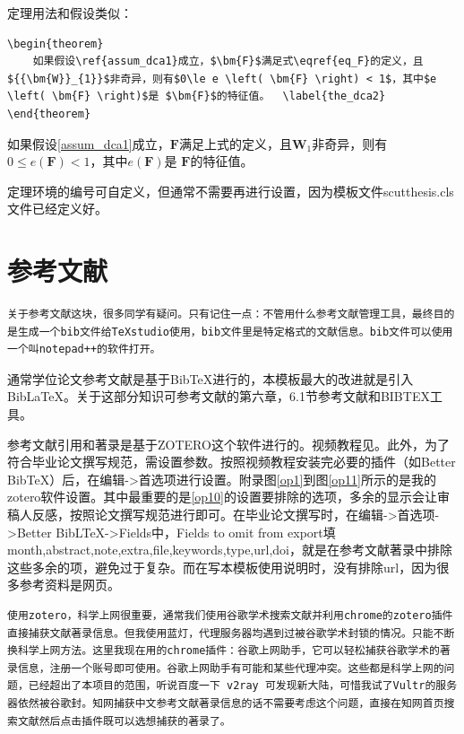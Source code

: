 定理用法和假设类似：
\begin{lstlisting}
\begin{theorem}
	如果假设\ref{assum_dca1}成立，$\bm{F}$满足式\eqref{eq_F}的定义，且${{\bm{W}}_{1}}$非奇异，则有$0\le e \left( \bm{F} \right) < 1$，其中$e \left( \bm{F} \right)$是 $\bm{F}$的特征值。	\label{the_dca2}
\end{theorem}
\end{lstlisting}
\begin{theorem}
	如果假设\ref{assum_dca1}成立，$\bm{F}$满足上式的定义，且${{\bm{W}}_{1}}$非奇异，则有$0\le e \left( \bm{F} \right) < 1$，其中$e \left( \bm{F} \right)$是 $\bm{F}$的特征值。	\label{the_dca2}
\end{theorem}

定理环境的编号可自定义，但通常不需要再进行设置，因为模板文件scutthesis.cls文件已经定义好。
\section{参考文献}

\begin{lstlisting}
关于参考文献这块，很多同学有疑问。只有记住一点：不管用什么参考文献管理工具，最终目的是生成一个bib文件给TeXstudio使用，bib文件里是特定格式的文献信息。bib文件可以使用一个叫notepad++的软件打开。
\end{lstlisting}

通常学位论文参考文献是基于BibTeX进行的，本模板最大的改进就是引入BibLaTeX。关于这部分知识可参考文献\parencite{_c,_g}的第六章，6.1节参考文献和BIBTEX工具。

参考文献引用和著录是基于ZOTERO这个软件进行的。视频教程见\parencite{_k}。此外，为了符合毕业论文撰写规范，需设置参数。按照视频教程安装完必要的插件（如Better BibTeX）后，在编辑->首选项进行设置。附录图\ref{op1}到图\ref{op11}所示的是我的zotero软件设置。其中最重要的是\ref{op10}的设置要排除的选项，多余的显示会让审稿人反感，按照论文撰写规范进行即可。在毕业论文撰写时，在编辑->首选项->Better BibLTeX->Fields中，Fields to omit from export填month,abstract,note,extra,file,keywords,type,url,doi，就是在参考文献著录中排除这些多余的项，避免过于复杂。而在写本模板使用说明时，没有排除url，因为很多参考资料是网页。

\begin{lstlisting}
使用zotero，科学上网很重要，通常我们使用谷歌学术搜索文献并利用chrome的zotero插件直接捕获文献著录信息。但我使用蓝灯，代理服务器均遇到过被谷歌学术封锁的情况。只能不断换科学上网方法。这里我现在用的chrome插件：谷歌上网助手，它可以轻松捕获谷歌学术的著录信息，注册一个账号即可使用。谷歌上网助手有可能和某些代理冲突。这些都是科学上网的问题，已经超出了本项目的范围，听说百度一下 v2ray 可发现新大陆，可惜我试了Vultr的服务器依然被谷歌封。知网捕获中文参考文献著录信息的话不需要考虑这个问题，直接在知网首页搜索文献然后点击插件既可以选想捕获的著录了。
\end{lstlisting}

